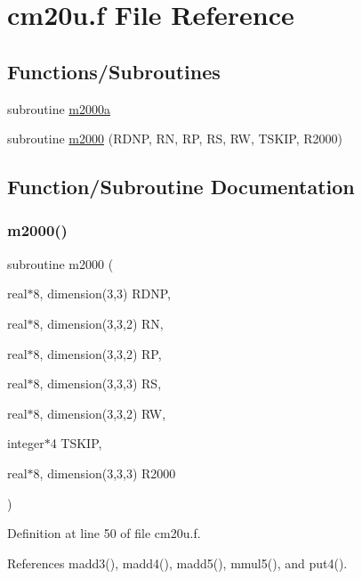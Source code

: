 \hypertarget{cm20u_8f}{}\section{cm20u.\+f File Reference}
\label{cm20u_8f}
\subsection*{Functions/\+Subroutines}
\begin{DoxyCompactItemize}
\item 
subroutine \hyperlink{cm20u_8f_a9c778f8f57ba39e6f6df3b90aa35654c}{m2000a}
\item 
subroutine \hyperlink{cm20u_8f_a8621828ca24cb7473cdd5527cf24b2d7}{m2000} (R\+D\+NP, RN, RP, RS, RW, T\+S\+K\+IP, R2000)
\end{DoxyCompactItemize}


\subsection{Function/\+Subroutine Documentation}
\mbox{\label{cm20u_8f_a8621828ca24cb7473cdd5527cf24b2d7}} 
\subsubsection{\texorpdfstring{m2000()}{m2000()}}
{\footnotesize\ttfamily subroutine m2000 (\begin{DoxyParamCaption}\item[{real$\ast$8, dimension(3,3)}]{R\+D\+NP,  }\item[{real$\ast$8, dimension(3,3,2)}]{RN,  }\item[{real$\ast$8, dimension(3,3,2)}]{RP,  }\item[{real$\ast$8, dimension(3,3,3)}]{RS,  }\item[{real$\ast$8, dimension(3,3,2)}]{RW,  }\item[{integer$\ast$4}]{T\+S\+K\+IP,  }\item[{real$\ast$8, dimension(3,3,3)}]{R2000 }\end{DoxyParamCaption})}



Definition at line 50 of file cm20u.\+f.



References madd3(), madd4(), madd5(), mmul5(), and put4().



